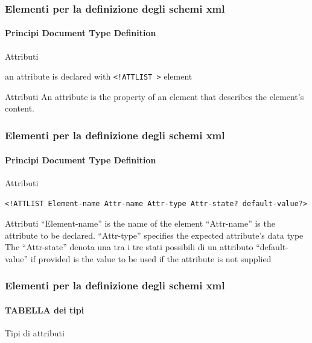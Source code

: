 \begin{frame}
    \frametitle{Elementi per la definizione degli schemi xml}
    \framesubtitle{Principi Document Type Definition}
    \addtocounter{nframe}{1}

    \begin{block}{Attributi}
    \begin{center} an attribute is declared with \texttt{<!ATTLIST >} element \end{center}
    \end{block}

    \begin{block}{Attributi}
        An attribute is the property of an element that describes the element’s content.
    \end{block}

\end{frame}

\begin{frame}
    \frametitle{Elementi per la definizione degli schemi xml}
    \framesubtitle{Principi Document Type Definition}
    \addtocounter{nframe}{1}

    \begin{block}{Attributi}
    \begin{center} \texttt{<!ATTLIST Element-name Attr-name Attr-type Attr-state? default-value?>} \end{center}
    \end{block}

    \begin{block}{Attributi}
        ``Element-name'' is the name of the element
        ``Attr-name'' is the attribute to be declared.
        ``Attr-type'' specifies the expected attribute’s data type
        The ``Attr-state'' denota una tra i tre stati possibili di un attributo 
        ``default-value'' if provided is the value to be used if the attribute is not supplied
    \end{block}

\end{frame}

\begin{frame}
    \frametitle{Elementi per la definizione degli schemi xml}
    \framesubtitle{TABELLA dei tipi}
    \addtocounter{nframe}{1}

    \begin{block}{Tipi di attributi}
    
    \end{block}
\end{frame}



